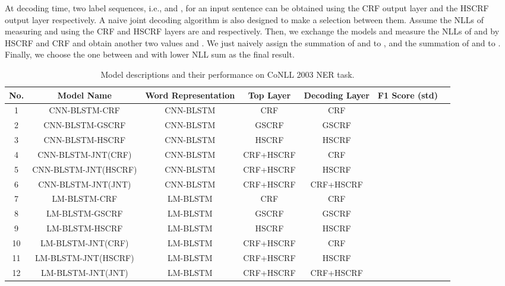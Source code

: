 \documentclass[11pt,a4paper]{article}
\begin{document}
At decoding time, two label sequences, i.e.,  and , for an input sentence can be obtained using the CRF output layer and the HSCRF output layer respectively.
A naive joint decoding algorithm is also designed to make a selection between them.
Assume the NLLs of measuring  and  using the CRF and HSCRF layers are  and  respectively.
Then, we exchange the models and measure the NLLs of  and  by HSCRF and CRF and obtain another two values  and .
We just naively assign the summation of  and  to , and the summation of  and   to .
Finally, we choose the one between  and  with lower NLL sum as the final result.

\begin{table*}[t!]
\small
\begin{center}
\begin{tabular}{|c|c|c|c|c|c|c|}
\hline
\bf No. & \bf Model Name       &  \bf Word Representation & \bf Top Layer & \bf Decoding Layer  & \bf F1 Score (std)  \\ \hline
1  &CNN-BLSTM-CRF       &  CNN-BLSTM       & CRF     &  CRF    &  \\ \hline
2  &CNN-BLSTM-GSCRF     &  CNN-BLSTM       & GSCRF   &  GSCRF  &  \\ \hline
3  &CNN-BLSTM-HSCRF     &  CNN-BLSTM       & HSCRF   &  HSCRF  &  \\ \hline
4  &CNN-BLSTM-JNT(CRF)  &  CNN-BLSTM       & CRF+HSCRF &  CRF    &  \\ \hline
5  &CNN-BLSTM-JNT(HSCRF)&  CNN-BLSTM       & CRF+HSCRF &  HSCRF  &  \\ \hline
6  &CNN-BLSTM-JNT(JNT)  & CNN-BLSTM        & CRF+HSCRF &  CRF+HSCRF&  \\ \hline
7  &LM-BLSTM-CRF        &  LM-BLSTM  & CRF     &  CRF    &  \\ \hline
8  &LM-BLSTM-GSCRF      &  LM-BLSTM  & GSCRF   &  GSCRF  &  \\ \hline
9  &LM-BLSTM-HSCRF      &  LM-BLSTM  & HSCRF   &  HSCRF  &  \\ \hline
10 &LM-BLSTM-JNT(CRF)   &  LM-BLSTM  & CRF+HSCRF &  CRF    &  \\ \hline
11 &LM-BLSTM-JNT(HSCRF) &  LM-BLSTM  & CRF+HSCRF &  HSCRF  &  \\ \hline
12 &LM-BLSTM-JNT(JNT)   &  LM-BLSTM  & CRF+HSCRF &  CRF+HSCRF&  \\ \hline
\end{tabular}
\end{center}
\caption{\label{Tab:allmodels} Model descriptions and their performance on CoNLL 2003 NER task. }
\end{table*}
\end{document}
